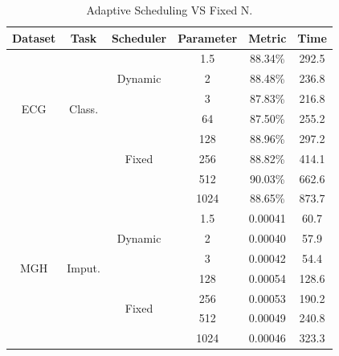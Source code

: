 \begin{table}[htbp]
\vspace{-2mm}
\centering
\footnotesize
\begin{tabular}{cc|c|c|cc}
\toprule
Dataset & Task & Scheduler & Parameter & Metric & Time\\
 \hline
 \multirow{6}{*}{ECG} & \multirow{6}{*}{Class.} & \multirow{3}{*}{Dynamic} & 1.5 & 88.34\% & 292.5  \\
  & &  & 2 & 88.48\% & 236.8 \\
  &   &  & 3 & 87.83\% & 216.8 \\
   \cline{3-6}
   &   & \multirow{5}{*}{Fixed}  & 64 & 87.50\% & 255.2\\
   &   &   & 128 & 88.96\% & 297.2\\
   &   &  & 256 & 88.82\% & 414.1 \\
   &   &  & 512 & 90.03\% & 662.6 \\
   &   &  & 1024 & 88.65\% & 873.7\\
   \hline \hline
   
 \multirow{6}{*}{MGH} & \multirow{6}{*}{Imput.} & \multirow{3}{*}{Dynamic} & 1.5 & 0.00041 &  60.7  \\
  & &  & 2 & 0.00040  & 57.9 \\
  &   &  & 3 & 0.00042  & 54.4   \\
   \cline{3-6}
   &   & \multirow{4}{*}{Fixed}  & 128 & 0.00054 & 128.6 \\
   &   &  & 256  & 0.00053 & 190.2\\
   &   &  & 512  & 0.00049 & 240.8\\
   &   &  & 1024  & 0.00046 & 323.3 \\
 \bottomrule
\end{tabular}
\caption{Adaptive Scheduling VS Fixed N.}
\label{tab.dynamic}
\vspace{-3mm}
\end{table}




